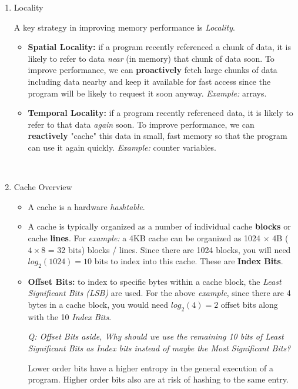 \documentclass[12pt]{article}
\newenvironment{QandA}{\begin{enumerate}[label=\bfseries\arabic*.]\bfseries}
                      {\end{enumerate}}
\newenvironment{answered}{\par\quad\normalfont}{}
\begin{document}
\begin{QandA}
\item Locality
\begin{answered}
A key strategy in improving memory performance is \textit{Locality}. 
\begin{itemize}
    \item \textbf{Spatial Locality:} if a program recently referenced a chunk of data, it is likely to refer to data \textit{near} (in memory) that chunk of data soon. To improve performance, we can \textbf{proactively} fetch large chunks of data including data nearby and keep it available for fast access since the program will be likely to request it soon anyway. \textit{Example:} arrays.
    \item \textbf{Temporal Locality:} if a program recently referenced data, it is likely to refer to that data \textit{again} soon. To improve performance, we can \textbf{reactively} "cache" this data in small, fast memory so that the program can use it again quickly. \textit{Example:} counter variables.
\end{itemize}
\end{answered}

\ 

\item Cache Overview
\begin{answered}
\vspace{-0.85cm}
\begin{itemize}
    \item A cache is a hardware \textit{hashtable}.
    \item A cache is typically organized as a number of individual cache \textbf{blocks} or cache \textbf{lines}. For \textit{example:} a 4KB cache can be organized as 1024 $\times$ 4B ($4 \times 8$ = 32 bits) blocks / lines. Since there are 1024 blocks, you will need $log_{2}(1024) = 10$ bits to index into this cache. These are \textbf{Index Bits}.
    \item \textbf{Offset Bits:} to index to specific bytes within a cache block, the \textit{Least Significant Bits (LSB)} are used. For the above \textit{example}, since there are 4 bytes in a cache block, you would need $log_{2}(4)=2$ offset bits along with the 10 \textit{Index Bits}.
    
    \textit{Q: Offset Bits aside, Why should we use the remaining 10 bits of Least Significant Bits as Index bits instead of maybe the Most Significant Bits?}
    
    \quad Lower order bits have a higher entropy in the general execution of a program. Higher order bits also are at risk of hashing to the same entry.
    

\end{itemize}
\end{answered}
\end{QandA}
\end{document}
